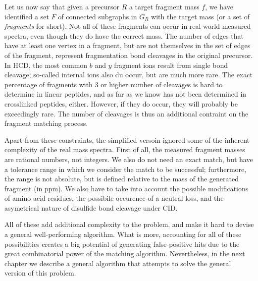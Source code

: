 Let us now say that given a precursor \(R\) a target fragment mass \(f\), we have identified a set \(F\) of connected subgraphs in \(G_R\) with the target mass (or a set of \emph{fragments} for short). Not all of these fragments can occur in real-world measured spectra, even though they do have the correct mass. The number of edges that have at least one vertex in a fragment, but are not themselves in the set of edges of the fragment, represent fragmentation bond cleavages in the original precursor. In HCD, the most common \(b\) and \(y\) fragment ions result from single bond cleavage; so-called internal ions also du occur, but are much more rare. The exact percentage of fragments with 3 or higher number of cleavages is hard to determine in linear peptides, and as far as we know has not been determined in crosslinked peptides, either. However, if they do occur, they will probably be exceedingly rare. The number of cleavages is thus an additional contraint on the fragment matching process.

Apart from these constraints, the simplified versoin ignored some of the inherent complexity of the real mass spectra. First of all, the measured fragment masses are rational numbers, not integers. We also do not need an exact match, but have a tolerance range in which we consider the match to be successful; furthermore, the range is not absolute, but is defined relative to the mass of the generated fragment (in ppm). We also have to take into account the possible modifications of amino acid residues, the possibile occurence of a neutral loss, and the asymetrical nature of disulfide bond cleavage under CID.

All of these add additional complexity to the problem, and make it hard to devise a general well-performing algorithm. What is more, accounting for all of these possibilities creates a big potential of generating false-positive hits due to the great combinatorial power of the matching algorithm. Nevertheless, in the next chapter we describe a general algorithm that attempts to solve the general version of this problem.





